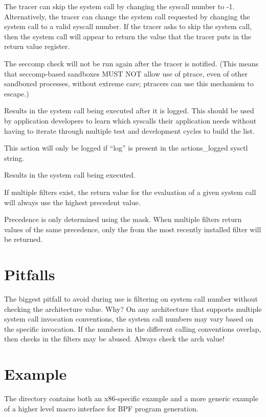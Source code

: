 \documentclass[a4paper,8pt,english]{sphinxmanual}
\begin{document}
\begin{description}
The tracer can skip the system call by changing the syscall number
to -1.  Alternatively, the tracer can change the system call
requested by changing the system call to a valid syscall number.  If
the tracer asks to skip the system call, then the system call will
appear to return the value that the tracer puts in the return value
register.

The seccomp check will not be run again after the tracer is
notified.  (This means that seccomp-based sandboxes MUST NOT
allow use of ptrace, even of other sandboxed processes, without
extreme care; ptracers can use this mechanism to escape.)

\item[{\code{SECCOMP\_RET\_LOG}:}] \leavevmode
Results in the system call being executed after it is logged. This
should be used by application developers to learn which syscalls their
application needs without having to iterate through multiple test and
development cycles to build the list.

This action will only be logged if ``log'' is present in the
actions\_logged sysctl string.

\item[{\code{SECCOMP\_RET\_ALLOW}:}] \leavevmode
Results in the system call being executed.

\end{description}

If multiple filters exist, the return value for the evaluation of a
given system call will always use the highest precedent value.

Precedence is only determined using the  mask.  When
multiple filters return values of the same precedence, only the
 from the most recently installed filter will be
returned.


\section{Pitfalls}
\label{userspace-api/seccomp_filter:pitfalls}
The biggest pitfall to avoid during use is filtering on system call
number without checking the architecture value.  Why?  On any
architecture that supports multiple system call invocation conventions,
the system call numbers may vary based on the specific invocation.  If
the numbers in the different calling conventions overlap, then checks in
the filters may be abused.  Always check the arch value!


\section{Example}
\label{userspace-api/seccomp_filter:example}
The  directory contains both an x86-specific example
and a more generic example of a higher level macro interface for BPF
program generation.
\end{document}
